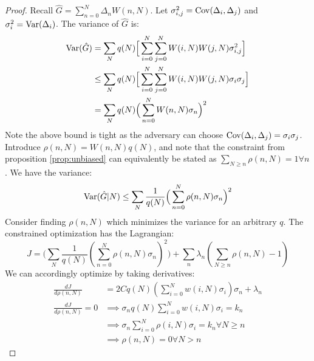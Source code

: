 \begin{proof}
Recall $\hat{G} = \sum_{n=0}^N \Delta_n W(n, N)$. Let $\sigma_{i, j}^2 = \mathrm{Cov}(\Delta_i, \Delta_j)$ and $\sigma_i^2 = \mathrm{Var}(\Delta_i)$. The variance of $\hat{G}$ is:
\begin{align*}
\mathrm{Var}(\hat{G}) &= \sum_N q(N) \Big[\sum_{i=0}^N \sum_{j=0}^N W(i, N) W(j, N) \sigma_{i, j}^2 \Big] \\
&\leq \sum_N q(N) \Big[\sum_{i=0}^N \sum_{j=0}^N W(i, N) W(j, N) \sigma_i \sigma_j \Big] \\
&= \sum_N q(N) \Big(\sum_{n=0}^N W(n, N) \sigma_n \Big)^2
\end{align*}
Note the above bound is tight as the adversary can choose $\mathrm{Cov}(\Delta_i, \Delta_j) = \sigma_i \sigma_j$. Introduce $\rho(n, N) = W(n, N) q(N)$, and note that the constraint from proposition \ref{prop:unbiased} can equivalently be stated as $\sum_{N \geq n} \rho(n, N) = 1 \forall n$. We have the variance:
\[
\mathrm{Var}(\hat{G} | N) \leq \sum_N \frac{1}{q(N)} \Big(\sum_{n=0}^N \rho(n, N) \sigma_n \Big)^2
\]
Consider finding $\rho(n, N)$ which minimizes the variance for an arbitrary $q$. The constrained optimization has the Lagrangian:
\[
J = \Big(\sum_N \frac{1}{q(N)} (\sum_{n=0}^N \rho(n, N) \sigma_n )^2\Big) + \sum_n \lambda_n (\sum_{N \geq n} \rho(n, N) - 1)
\]
We can accordingly optimize by taking derivatives:
\begin{align*}
    \frac{dJ}{d\rho(n, N)} &= 2C q(N)(\sum_{i=0}^N w(i, N) \sigma_i) \sigma_n + \lambda_n\\
    \frac{dJ}{d\rho(n, N)} = 0 &\implies \sigma_n q(N) \sum_{i=0}^N w(i, N) \sigma_i = k_n\\
    &\implies \sigma_n \sum_{i=0}^N \rho(i, N) \sigma_i = k_n \forall N \geq n\\
    &\implies \rho(n, N) = 0 \forall N > n
\end{align*}
\end{proof}

